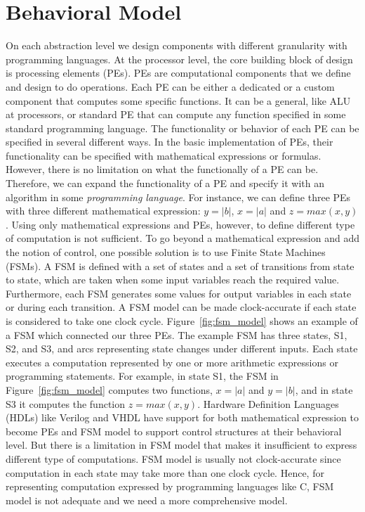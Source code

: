 \section{Behavioral Model}
\label{sec:processor_level_behavioral_model}

On each abstraction level we design components with different granularity with programming languages. At the processor level, the core building block of design is processing elements (PEs).
PEs are computational components that we define and design to do operations.
Each PE can be either a dedicated or a custom component that computes some specific functions.
It can be a general, like ALU at processors, or standard PE that can compute any function specified in some standard programming language.
The functionality or behavior of each PE can be specified in several different ways.
In the basic implementation of PEs, their functionality can be specified with mathematical expressions or formulas.
However, there is no limitation on what the functionally of a PE can be.
Therefore, we can expand the functionality of a PE and specify it with an algorithm in some \textit{programming language}.
For instance, we can define three PEs with three different mathematical expression: $y = |b|$, $x = |a|$ and $z = max (x, y)$.
Using only mathematical expressions and PEs, however, to define different type of computation is not sufficient.
To go beyond a mathematical expression and add the notion of control, one possible solution is to use Finite State Machines (FSMs).
A FSM is defined with a set of states and a set of transitions from state to state, which are taken when some input variables reach the required value.
Furthermore, each FSM generates some values for output variables in each state or during each transition. A FSM model can be made clock-accurate if each state is considered to take one clock cycle.
Figure~\ref{fig:fsm_model} shows an example of a FSM which connected our three PEs.
The example FSM has three states, S1, S2, and S3, and arcs representing state changes under different inputs.
Each state executes a computation represented by one or more arithmetic expressions or programming statements.
For example, in state S1, the FSM in Figure~\ref{fig:fsm_model} computes two functions, $x = |a|$ and $y = |b|$, and in state S3 it computes the function $z = max (x, y)$.
Hardware Definition Languages (HDLs) like Verilog and VHDL have support for both mathematical expression to become PEs and FSM model to support control structures at their behavioral level.
But there is a limitation in FSM model that makes it insufficient to express different type of computations.
FSM model is usually not clock-accurate since computation in each state may take more than one clock cycle.
Hence, for representing computation expressed by programming languages like C, FSM model is not adequate and we need a more comprehensive model.


